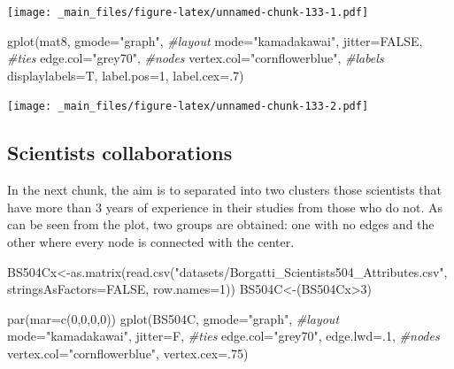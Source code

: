 \documentclass[
  notitlepage,
  onecolumn,
  openany]{book}
\newenvironment{Shaded}{\begin{snugshade}}{\end{snugshade}}
\newcommand{\AttributeTok}[1]{\textcolor[rgb]{0.77,0.63,0.00}{#1}}
\newcommand{\CommentTok}[1]{\textcolor[rgb]{0.56,0.35,0.01}{\textit{#1}}}
\newcommand{\ConstantTok}[1]{\textcolor[rgb]{0.00,0.00,0.00}{#1}}
\newcommand{\DecValTok}[1]{\textcolor[rgb]{0.00,0.00,0.81}{#1}}
\newcommand{\FunctionTok}[1]{\textcolor[rgb]{0.00,0.00,0.00}{#1}}
\newcommand{\NormalTok}[1]{#1}
\newcommand{\OtherTok}[1]{\textcolor[rgb]{0.56,0.35,0.01}{#1}}
\newcommand{\SpecialCharTok}[1]{\textcolor[rgb]{0.00,0.00,0.00}{#1}}
\newcommand{\StringTok}[1]{\textcolor[rgb]{0.31,0.60,0.02}{#1}}
\begin{document}
\texttt{[image: \_main\_files/figure-latex/unnamed-chunk-133-1.pdf]}

\begin{Shaded}
\begin{Highlighting}[]
\FunctionTok{gplot}\NormalTok{(mat8, }
      \AttributeTok{gmode=}\StringTok{"graph"}\NormalTok{,}
      \CommentTok{\#layout}
      \AttributeTok{mode=}\StringTok{"kamadakawai"}\NormalTok{,}
      \AttributeTok{jitter=}\ConstantTok{FALSE}\NormalTok{,}
      \CommentTok{\#ties}
      \AttributeTok{edge.col=}\StringTok{"grey70"}\NormalTok{,}
      \CommentTok{\#nodes}
      \AttributeTok{vertex.col=}\StringTok{"cornflowerblue"}\NormalTok{,}
      \CommentTok{\#labels}
      \AttributeTok{displaylabels=}\NormalTok{T,}
      \AttributeTok{label.pos=}\DecValTok{1}\NormalTok{,}
      \AttributeTok{label.cex=}\NormalTok{.}\DecValTok{7}\NormalTok{)}
\end{Highlighting}
\end{Shaded}

\texttt{[image: \_main\_files/figure-latex/unnamed-chunk-133-2.pdf]}

\hypertarget{scientists-collaborations}{%
\subsection{Scientists collaborations}\label{scientists-collaborations}}

In the next chunk, the aim is to separated into two clusters those scientists that have more than 3 years of experience in their studies from those who do not. As can be seen from the plot, two groups are obtained: one with no edges and the other where every node is connected with the center.

\begin{Shaded}
\begin{Highlighting}[]
\NormalTok{BS504Cx}\OtherTok{\textless{}{-}}\FunctionTok{as.matrix}\NormalTok{(}\FunctionTok{read.csv}\NormalTok{(}\StringTok{"datasets/Borgatti\_Scientists504\_Attributes.csv"}\NormalTok{,}
                            \AttributeTok{stringsAsFactors=}\ConstantTok{FALSE}\NormalTok{, }\AttributeTok{row.names=}\DecValTok{1}\NormalTok{))}
\NormalTok{BS504C}\OtherTok{\textless{}{-}}\NormalTok{(BS504Cx}\SpecialCharTok{\textgreater{}}\DecValTok{3}\NormalTok{)}

\FunctionTok{par}\NormalTok{(}\AttributeTok{mar=}\FunctionTok{c}\NormalTok{(}\DecValTok{0}\NormalTok{,}\DecValTok{0}\NormalTok{,}\DecValTok{0}\NormalTok{,}\DecValTok{0}\NormalTok{))}
\FunctionTok{gplot}\NormalTok{(BS504C, }
      \AttributeTok{gmode=}\StringTok{"graph"}\NormalTok{,}
      \CommentTok{\#layout}
      \AttributeTok{mode=}\StringTok{"kamadakawai"}\NormalTok{,}
      \AttributeTok{jitter=}\NormalTok{F,}
      \CommentTok{\#ties}
      \AttributeTok{edge.col=}\StringTok{"grey70"}\NormalTok{, }
      \AttributeTok{edge.lwd=}\NormalTok{.}\DecValTok{1}\NormalTok{,}
      \CommentTok{\#nodes}
      \AttributeTok{vertex.col=}\StringTok{"cornflowerblue"}\NormalTok{,}
      \AttributeTok{vertex.cex=}\NormalTok{.}\DecValTok{75}\NormalTok{)}
\end{Highlighting}
\end{Shaded}
\end{document}
